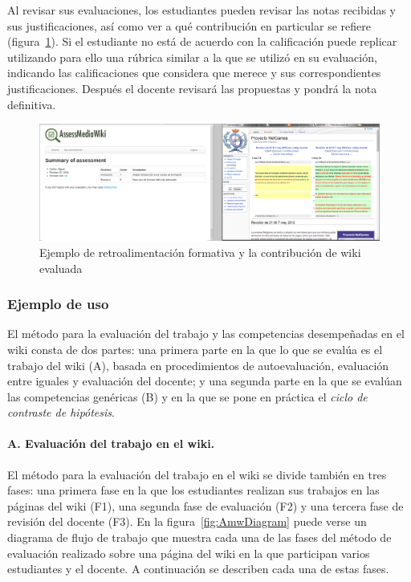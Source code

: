 		Al revisar sus evaluaciones, los estudiantes pueden revisar las notas recibidas y sus justificaciones, así como ver a qué contribución en particular se refiere (figura~\ref{fig:AmwFormative}). Si el estudiante no está de acuerdo con la calificación puede replicar utilizando para ello una rúbrica similar a la que se utilizó en su evaluación, indicando las calificaciones que considera que merece y sus correspondientes justificaciones. Después el docente revisará las propuestas y pondrá la nota definitiva.

\begin{figure}
  \begin{center}
    \includegraphics[scale=0.19]{AmwFormative.png}
  \end{center}
  \caption{Ejemplo de retroalimentación formativa y la contribución de wiki evaluada}
  \label{fig:AmwFormative}
\end{figure}

			\subsubsection*{Ejemplo de uso}

			El método para la evaluación del trabajo y las competencias desempeñadas en el wiki consta de dos partes: una primera parte en la que lo que se evalúa es el trabajo del wiki (A), basada en procedimientos de autoevaluación, evaluación entre iguales y evaluación del docente; y una segunda parte en la que se evalúan las competencias genéricas (B) y en la que se pone en práctica el \emph{ciclo de contraste de hipótesis}.

			\paragraph*{A. Evaluación del trabajo en el wiki.}

			El método para la evaluación del trabajo en el wiki se divide también en tres fases: una primera fase en la que los estudiantes realizan sus trabajos en las páginas del wiki (F1), una segunda fase de evaluación (F2) y una tercera fase de revisión del docente (F3). En la figura~\ref{fig:AmwDiagram} puede verse un diagrama de flujo de trabajo que muestra cada una de las fases del método de evaluación realizado sobre una página del wiki en la que participan varios estudiantes y el docente. A continuación se describen cada una de estas fases.

